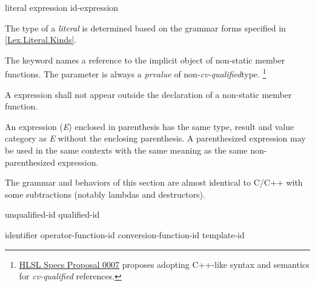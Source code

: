 
\begin{grammar}
  \br
  literal\br
  \br
  \terminal{(} expression \terminal{)}\br
  id-expression\br
\end{grammar}


\p The type of a \textit{literal} is determined based on the grammar forms
specified in \ref{Lex.Literal.Kinds}.


\p The keyword  names a reference to the implicit object of
non-static member functions. The  parameter is always a
\textit{prvalue} of non-\textit{cv-qualified}type.
\footnote{
  \href{https://github.com/microsoft/hlsl-specs/blob/main/proposals/0007-const-instance-methods.md}
  {HLSL Specs Proposal 0007} proposes adopting C++-like syntax and semantics for
  \textit{cv-qualified}  references.}
  
\p A  expression shall not appear outside the declaration of a
non-static member function.


\p An expression (\textit{E}) enclosed in parenthesis has the same type, result
and value category as \textit{E} without the enclosing parenthesis. A
parenthesized expression may be used in the same contexts with the same meaning
as the same non-parenthesized expression.


\begin{note}
  The grammar and behaviors of this section are almost identical to C/C++ with
  some subtractions (notably lambdas and destructors).
\end{note}

\begin{grammar}
  \br
  unqualified-id\br
  qualified-id
\end{grammar}


\begin{grammar}
  \br
  identifier\br
  operator-function-id\br
  conversion-function-id\br
  template-id\br
\end{grammar}

